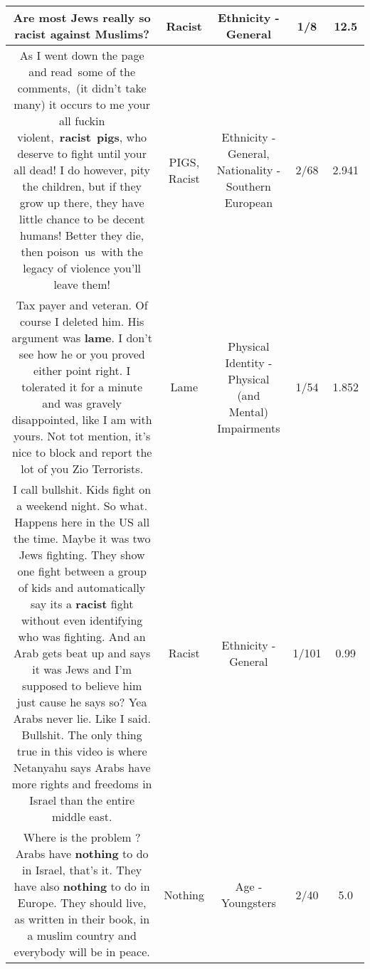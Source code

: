 \documentclass[11pt]{article}
\newlength\mylength
\begin{document}
\begin{center}
\begin{longtable}{|C{.65\mylength}|C{.30\mylength}|C{.12\mylength}|C{.12\mylength}|C{.12\mylength}|}
  \small Are most Jews really so \textbf{racist} against Muslims?\normalsize   & Racist & Ethnicity - General & 1/8 & 12.5 \\  \hline
  \small As I went down the page and read some of the comments, (it didn't take many) it occurs to me your all fuckin violent, \textbf{racist} \textbf{pigs}, who deserve to fight until your all dead! I do however, pity the children, but if they grow up there, they have little chance to be decent humans! Better they die, then poison us with the legacy of violence you'll leave them!\normalsize   & PIGS, Racist & Ethnicity - General, Nationality - Southern European & 2/68 & 2.941 \\  \hline
  \small Tax payer and veteran. Of course I deleted him. His argument was \textbf{lame}. I don't see how he or you proved either point right. I tolerated it for a minute and was gravely disappointed, like I am with yours. Not tot mention, it's nice to block and report the lot of you Zio Terrorists.\normalsize   & Lame & Physical Identity - Physical (and Mental) Impairments & 1/54 & 1.852 \\  \hline
  \small I call bullshit. Kids fight on a weekend night. So what. Happens here in the US all the time. Maybe it was two Jews fighting. They show one fight between a group of kids and automatically say its a \textbf{racist} fight without even identifying who was fighting. And an Arab gets beat up and says it was Jews and I'm supposed to believe him just cause he says so?  Yea Arabs never lie. Like I said. Bullshit. The only thing true in this video is where Netanyahu says Arabs have more rights and freedoms in Israel than the entire middle east.\normalsize   & Racist & Ethnicity - General & 1/101 & 0.99 \\  \hline
  \small Where is the problem ? Arabs have \textbf{nothing} to do in Israel, that's it. They have also \textbf{nothing} to do in Europe. They should live, as written in their book, in a muslim country and everybody will be in peace.\normalsize   & Nothing & Age - Youngsters & 2/40 & 5.0 \\  \hline

\end{longtable}
\end{center}
\end{document}
